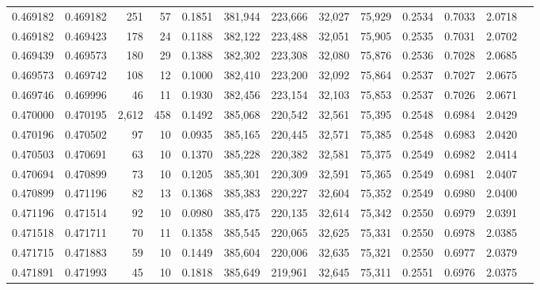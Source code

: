 \begin{tabular}{rrrrrrrrrrrrr}
0.469182 & 0.469182 &   251 &  57 &                                     0.1851 & 381,944 & 223,666 &  32,027 &  75,929 & 0.2534 & 0.7033 & 2.0718 \\
0.469182 & 0.469423 &   178 &  24 &                                     0.1188 & 382,122 & 223,488 &  32,051 &  75,905 & 0.2535 & 0.7031 & 2.0702 \\
0.469439 & 0.469573 &   180 &  29 &                                     0.1388 & 382,302 & 223,308 &  32,080 &  75,876 & 0.2536 & 0.7028 & 2.0685 \\
0.469573 & 0.469742 &   108 &  12 &                                     0.1000 & 382,410 & 223,200 &  32,092 &  75,864 & 0.2537 & 0.7027 & 2.0675 \\
0.469746 & 0.469996 &    46 &  11 &                                     0.1930 & 382,456 & 223,154 &  32,103 &  75,853 & 0.2537 & 0.7026 & 2.0671 \\
0.470000 & 0.470195 & 2,612 & 458 &                                     0.1492 & 385,068 & 220,542 &  32,561 &  75,395 & 0.2548 & 0.6984 & 2.0429 \\
0.470196 & 0.470502 &    97 &  10 &                                     0.0935 & 385,165 & 220,445 &  32,571 &  75,385 & 0.2548 & 0.6983 & 2.0420 \\
0.470503 & 0.470691 &    63 &  10 &                                     0.1370 & 385,228 & 220,382 &  32,581 &  75,375 & 0.2549 & 0.6982 & 2.0414 \\
0.470694 & 0.470899 &    73 &  10 &                                     0.1205 & 385,301 & 220,309 &  32,591 &  75,365 & 0.2549 & 0.6981 & 2.0407 \\
0.470899 & 0.471196 &    82 &  13 &                                     0.1368 & 385,383 & 220,227 &  32,604 &  75,352 & 0.2549 & 0.6980 & 2.0400 \\
0.471196 & 0.471514 &    92 &  10 &                                     0.0980 & 385,475 & 220,135 &  32,614 &  75,342 & 0.2550 & 0.6979 & 2.0391 \\
0.471518 & 0.471711 &    70 &  11 &                                     0.1358 & 385,545 & 220,065 &  32,625 &  75,331 & 0.2550 & 0.6978 & 2.0385 \\
0.471715 & 0.471883 &    59 &  10 &                                     0.1449 & 385,604 & 220,006 &  32,635 &  75,321 & 0.2550 & 0.6977 & 2.0379 \\
0.471891 & 0.471993 &    45 &  10 &                                     0.1818 & 385,649 & 219,961 &  32,645 &  75,311 & 0.2551 & 0.6976 & 2.0375 \\

\end{tabular}
